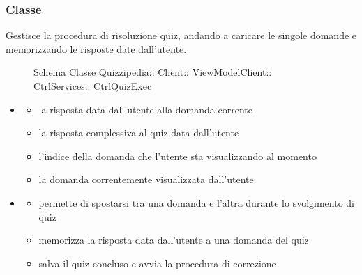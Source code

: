 \subsubsection{Classe }
Gestisce la procedura di risoluzione quiz, andando a caricare le singole domande e memorizzando le risposte date dall'utente.
\begin{figure}[H]
\centering
\noindent{}
\caption[Schema Classe CtrlQuizExec]{Schema Classe Quizzipedia:: Client:: ViewModelClient:: CtrlServices:: CtrlQuizExec}
\end{figure}
\begin{itemize}
\item {}
\begin{itemize}
\item {}
\newline
la risposta data dall'utente alla domanda corrente
\item {}
\newline
la risposta complessiva al quiz data dall'utente
\item {}
\newline
l'indice della domanda che l'utente sta visualizzando al momento
\item {}
\newline
la domanda correntemente visualizzata dall'utente
\end{itemize}
\item {}
\begin{itemize}
\item {}
\newline
permette di spostarsi tra una domanda e l'altra durante lo svolgimento di quiz
\newline
\item {}
\newline
memorizza la risposta data dall'utente a una domanda del quiz
\newline
\item {}
\newline
salva il quiz concluso e avvia la procedura di correzione
\newline
\end{itemize}
\end{itemize}
